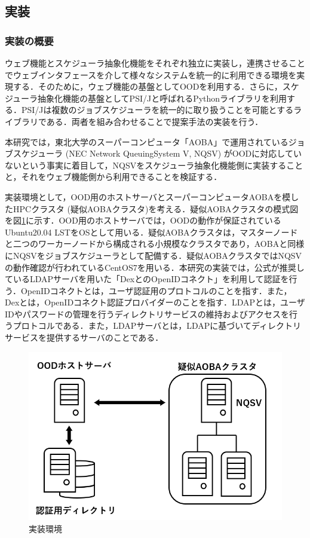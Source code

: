 \subsection{実装}
\subsubsection{実装の概要}
ウェブ機能とスケジューラ抽象化機能をそれぞれ独立に実装し，連携させることでウェブインタフェースを介して様々なシステムを統一的に利用できる環境を実現する．そのために，ウェブ機能の基盤としてOODを利用する．さらに，スケジューラ抽象化機能の基盤としてPSI/J\cite{cite5}と呼ばれるPythonライブラリを利用する．PSI/Jは複数のジョブスケジューラを統一的に取り扱うことを可能とするライブラリである．両者を組み合わせることで提案手法の実装を行う．\par
本研究では，東北大学のスーパーコンピュータ「AOBA」\cite{aoba}で運用されているジョブスケジューラ (NEC Network QueuingSystem V, NQSV) \cite{nqsv_scheduler}がOODに対応していないという事実に着目して，NQSVをスケジューラ抽象化機能側に実装することと，それをウェブ機能側から利用できることを検証する．\par
実装環境として，OOD用のホストサーバとスーパーコンピュータAOBAを模したHPCクラスタ (疑似AOBAクラスタ)を考える．疑似AOBAクラスタの模式図を図\ref{fig7}に示す．OOD用のホストサーバでは，OODの動作が保証されているUbuntu20.04 LSTをOSとして用いる．疑似AOBAクラスタは，マスターノードと二つのワーカーノードから構成される小規模なクラスタであり，AOBAと同様にNQSVをジョブスケジューラとして配備する．疑似AOBAクラスタではNQSVの動作確認が行われているCentOS7を用いる\cite{nqsv_introduction}．本研究の実装では，公式が推奨しているLDAPサーバを用いた「DexとのOpenIDコネクト」を利用して認証を行う\cite{cite7}\cite{cite8}．OpenIDコネクトとは，ユーザ認証用のプロトコルのことを指す．また，Dexとは，OpenIDコネクト認証プロバイダーのことを指す．LDAPとは，ユーザIDやパスワードの管理を行うディレクトリサービスの維持およびアクセスを行うプロトコルである．また，LDAPサーバとは，LDAPに基づいてディレクトリサービスを提供するサーバのことである．\par

\begin{figure}[tb]
    \centering
    \includegraphics[width=120mm]{./fig/environment.png}
    \caption{実装環境}
    \label{fig7}
\end{figure}


